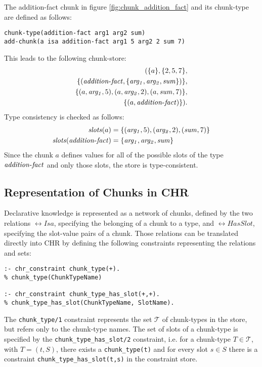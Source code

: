 \begin{example}
 \label{ex:addition_fact_formal}
 The addition-fact chunk in figure \ref{fig:chunk_addition_fact} and its chunk-type are defined as follows:
 
\begin{lstlisting}
chunk-type(addition-fact arg1 arg2 sum)
add-chunk(a isa addition-fact arg1 5 arg2 2 sum 7)
\end{lstlisting}
 
 This leads to the following chunk-store: 
 \begin{align*}
 (\{a\}, \{2, 5, 7\},\\ 
 \{(\mathord{\mathit{addition\mbox{-}fact}}, \{\mathord{\mathit{arg_1}}, \mathord{\mathit{arg_2}}, \mathord{\mathit{sum}}\})\},\\
 \{(a, \mathord{\mathit{arg_1}}, 5), (a, \mathord{\mathit{arg_2}}, 2), (a, \mathord{\mathit{sum}}, 7)\},\\
 \{(a, \mathord{\mathit{addition\mbox{-}fact)}}\}).
 \end{align*}
 Type consistency is checked as follows:
 \begin{align*}
 \mathord{\mathit{slots}}(a) &= \{(\mathord{\mathit{arg_1}}, 5), (\mathord{\mathit{arg_2}}, 2), (\mathord{\mathit{sum}}, 7)\}\\
 \mathord{\mathit{slots}}(\mathord{\mathit{addition\mbox{-}fact}}) &= \{\mathord{\mathit{arg_1}}, \mathord{\mathit{arg_2}}, \mathord{\mathit{sum}}\}
 \end{align*}
 Since the chunk $a$ defines values for all of the possible slots of the type $\mathord{\mathit{addition\mbox{-}fact}}$ and only those slots, the store is type-consistent.
\end{example}

\subsection{Representation of Chunks in CHR}

Declarative knowledge is represented as a network of chunks, defined by the two relations $\rel{Isa}$, specifying the belonging of a chunk to a type, and $\rel{HasSlot}$, specifying the slot-value pairs of a chunk. Those relations can be translated directly into CHR by defining the following constraints representing the relations and sets:

\begin{lstlisting}
:- chr_constraint chunk_type(+).
% chunk_type(ChunkTypeName)

:- chr_constraint chunk_type_has_slot(+,+).
% chunk_type_has_slot(ChunkTypeName, SlotName).
\end{lstlisting}

The \lstinline|chunk_type/1| constraint represents the set $\mathcal{T}$ of chunk-types in the store, but refers only to the chunk-type names. The set of slots of a chunk-type is specified by the \lstinline|chunk_type_has_slot/2| constraint, i.e. for a chunk-type $T \in \mathcal{T}$, with $T = (t, S)$, there exists a \texttt{chunk\_type(t)} and for every slot $s \in S$ there is a constraint \lstinline|chunk_type_has_slot(t,s)| in the constraint store.

